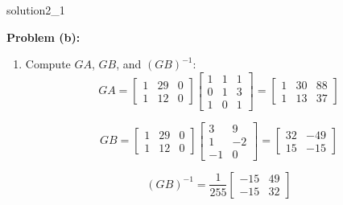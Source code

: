 \begin{solution}{}{solution2_1}
	\bigskip

	\textbf{Problem (b):}

	\begin{enumerate}
		\item Compute \( GA \), \( GB \), and \( (GB)^{-1} \):
		      \[
			      GA = \begin{bmatrix}
				      1 & 29 & 0 \\
				      1 & 12 & 0
			      \end{bmatrix}
			      \begin{bmatrix}
				      1 & 1 & 1 \\
				      0 & 1 & 3 \\
				      1 & 0 & 1
			      \end{bmatrix}
			      = \begin{bmatrix}
				      1 & 30 & 88 \\
				      1 & 13 & 37
			      \end{bmatrix}
		      \]

		      \[
			      GB = \begin{bmatrix}
				      1 & 29 & 0 \\
				      1 & 12 & 0
			      \end{bmatrix}
			      \begin{bmatrix}
				      3  & 9  \\
				      1  & -2 \\
				      -1 & 0
			      \end{bmatrix}
			      = \begin{bmatrix}
				      32 & -49 \\
				      15 & -15
			      \end{bmatrix}
		      \]

		      \[
			      (GB)^{-1} = \frac{1}{255}
			      \begin{bmatrix}
				      -15 & 49 \\
				      -15 & 32
			      \end{bmatrix}
		      \]


\end{enumerate}
\end{solution}
